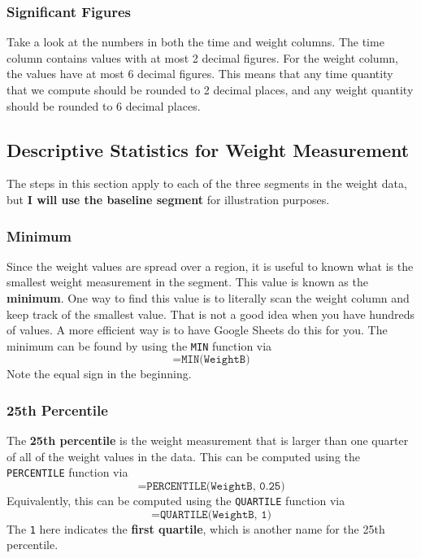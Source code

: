 \subsubsection{Significant Figures}
Take a look at the numbers in both the time and weight columns. The time column contains values with at most 2 decimal figures. For the weight column, the values have at most 6 decimal figures. This means that any time quantity that we compute should be rounded to 2 decimal places, and any weight quantity should be rounded to 6 decimal places.
\subsection{Descriptive Statistics for Weight Measurement}
The steps in this section apply to each of the three segments in the weight data, but \textbf{I will use the baseline segment} for illustration purposes.
\subsubsection{Minimum}
Since the weight values are spread over a region, it is useful to known what is the smallest weight measurement in the segment. This value is known as the \textbf{minimum}. One way to find this value is to literally scan the weight column and keep track of the smallest value. That is not a good idea when you have hundreds of values. A more efficient way is to have Google Sheets do this for you. The minimum can be found by using the \texttt{MIN} function via
\begin{equation}
    \texttt{=MIN(WeightB)}
    \label{eq:00.min}
\end{equation}
Note the equal sign in the beginning.
\subsubsection{25th Percentile}
The \textbf{25th percentile} is the weight measurement that is larger than one quarter of all of the weight values in the data. This can be computed using the \texttt{PERCENTILE} function via
\begin{equation}
    \texttt{=PERCENTILE(WeightB, 0.25)}
    \label{eq:00.percentile.25}
\end{equation}
Equivalently, this can be computed using the \texttt{QUARTILE} function via
\begin{equation}
    \texttt{=QUARTILE(WeightB, 1)}
\end{equation}
The \texttt{1} here indicates the \textbf{first quartile}, which is another name for the 25th percentile.

